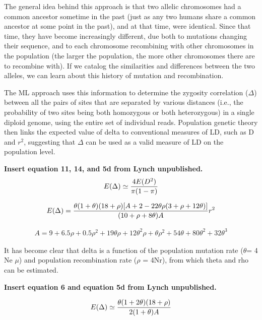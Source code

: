 \documentclass{sig-alternate}
\begin{document}
The general idea behind this approach is that two allelic chromosomes had a common ancestor sometime in the past (just as any two humans share a common ancestor at some point in the past), and at that time, were identical. Since that time, they have become increasingly different, due both to mutations changing their sequence, and to each chromosome recombining with other chromosomes in the population (the larger the population, the more other chromosomes there are to recombine with). If we catalog the similarities and differences between the two alleles, we can learn about this history of mutation and recombination. 

The ML approach uses this information to determine the zygosity correlation ($\Delta$) between all the pairs of sites that are separated by various distances (i.e., the probability of two sites being both homozygous or both heterozygous) in a single diploid genome, using the entire set of individual reads. Population genetic theory then links the expected value of delta to conventional measures of LD, such as D and $r^2$, suggesting that $\Delta$ can be used as a valid measure of LD on the population level.

{\center \bf Insert equation 11, 14, and 5d from Lynch unpublished.}
\begin{eqnarray}
E(\Delta) \simeq {4E(D^2)\over \pi(1-\pi)}
\label{eq:edelta}
\end{eqnarray}

 \begin{eqnarray}
E(\Delta) = {{\theta(1+\theta)(18+\rho)[A+2-22\theta \rho(3+\rho+12\theta)]} \over {(10+\rho+8\theta)A}}r^2
\label{eq:edelta}
\end{eqnarray}

 \begin{eqnarray}
A = 9+6.5\rho + 0.5\rho^2+19\theta \rho+12\theta^2\rho+\theta \rho^2+54\theta+80\theta^2+32\theta^3
\label{eq:edelta}
\end{eqnarray}


It has become clear that delta is a function of the population mutation rate ($\theta$= 4 Ne $\mu$) and population recombination rate ($\rho$ = 4Nr), from which theta and rho can be estimated.

{\center \bf Insert equation 6 and equation 5d from Lynch unpublished.}


 \begin{eqnarray}
E(\Delta) \simeq {{\theta(1+2\theta)(18+\rho)} \over {2(1+\theta)A}}
\label{eq:edelta}
\end{eqnarray}
\end{document}
